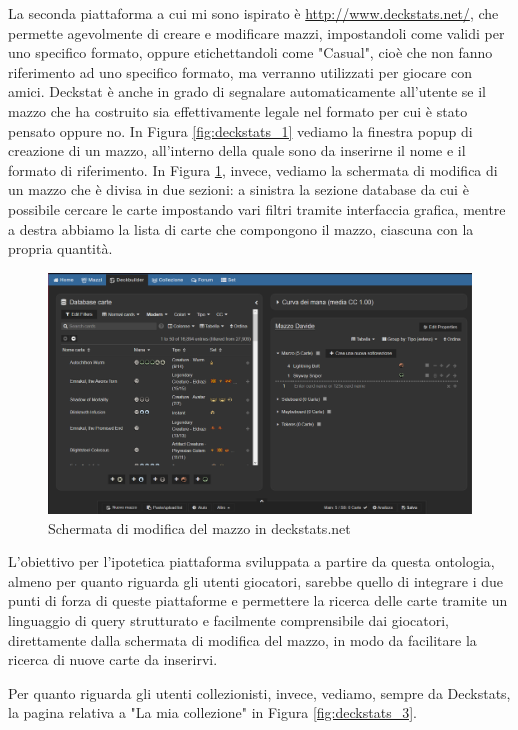 \documentclass[12pt]{article}
\begin{document}
La seconda piattaforma a cui mi sono ispirato è \url{http://www.deckstats.net/}, che permette agevolmente di creare e modificare mazzi, impostandoli come validi per uno specifico formato, oppure etichettandoli come "Casual", cioè che non fanno riferimento ad uno specifico formato, ma verranno utilizzati per giocare con amici. Deckstat è anche in grado di segnalare automaticamente all'utente se il mazzo che ha costruito sia effettivamente legale nel formato per cui è stato pensato oppure no. In Figura \ref{fig:deckstats_1} vediamo la finestra popup di creazione di un mazzo, all'interno della quale sono da inserirne il nome e il formato di riferimento. In Figura \ref{fig:deckstats_2}, invece, vediamo la schermata di modifica di un mazzo che è divisa in due sezioni: a sinistra la sezione database da cui è possibile cercare le carte impostando vari filtri tramite interfaccia grafica, mentre a destra abbiamo la lista di carte che compongono il mazzo, ciascuna con la propria quantità.

\begin{figure}[H]
    \centering
         \includegraphics[width=14cm]{files/deckstats_2.png}
    \caption{Schermata di modifica del mazzo in deckstats.net}
    \label{fig:deckstats_2}
\end{figure}

L'obiettivo per l'ipotetica piattaforma sviluppata a partire da questa ontologia, almeno per quanto riguarda gli utenti giocatori, sarebbe quello di integrare i due punti di forza di queste piattaforme e permettere la ricerca delle carte tramite un linguaggio di query strutturato e facilmente comprensibile dai giocatori, direttamente dalla schermata di modifica del mazzo, in modo da facilitare la ricerca di nuove carte da inserirvi.

Per quanto riguarda gli utenti collezionisti, invece, vediamo, sempre da Deckstats, la pagina relativa a "La mia collezione" in Figura \ref{fig:deckstats_3}.
\end{document}
